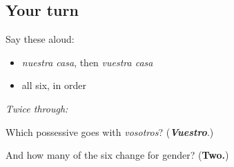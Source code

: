 \subsection*{Your turn}
Say these aloud:

\begin{itemize}
\raggedright
  \item \emph{nuestra casa}, then \emph{vuestra casa}
  \item all six, in order
\end{itemize}

\emph{Twice through:}

\begin{tcolorbox}[breakable,colback=teal!4,colframe=teal!35!black,title={Before you move on}]
Which possessive goes with \emph{vosotros}? (\emph{\textbf{Vuestro}}.)

And how many of the six change for gender? (\textbf{Two.})
\end{tcolorbox}
